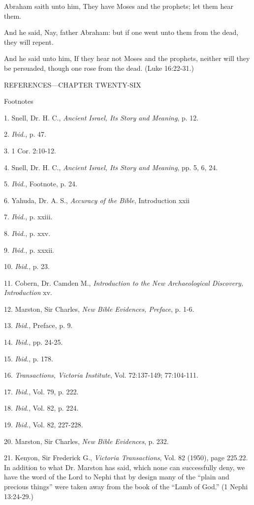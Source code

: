 Abraham saith unto him, They have Moses and the prophets; let them hear them.

And he said, Nay, father Abraham: but if one went unto them from the dead, they will repent.

And he said unto him, If they hear not Moses and the prophets, neither will they be
persuaded, though one rose from the dead. (Luke 16:22-31.)

\newpage
REFERENCES—CHAPTER TWENTY-SIX

Footnotes

1. Snell, Dr. H. C., \textit{Ancient Israel, Its Story and Meaning}, p. 12.

2. \textit{Ibid.}, p. 47.

3. 1 Cor. 2:10-12.

4. Snell, Dr. H. C., \textit{Ancient Israel, Its Story and Meaning}, pp. 5, 6, 24.

5. \textit{Ibid.}, Footnote, p. 24.

6. Yahuda, Dr. A. S., \textit{Accuracy of the Bible}, Introduction xxii

7. \textit{Ibid.}, p. xxiii.

8. \textit{Ibid.}, p. xxv.

9. \textit{Ibid.}, p. xxxii.

10. \textit{Ibid.}, p. 23.

11. Cobern, Dr. Camden M., \textit{Introduction to the New Archaeological Discovery, Introduction}
xv.

12. Marston, Sir Charles, \textit{New Bible Evidences, Preface}, p. 1-6.

13. \textit{Ibid.}, Preface, p. 9.

14. \textit{Ibid.}, pp. 24-25.

15. \textit{Ibid.}, p. 178.

16. \textit{Transactions, Victoria Institute}, Vol. 72:137-149; 77:104-111.

17. \textit{Ibid.}, Vol. 79, p. 222.

18. \textit{Ibid.}, Vol. 82, p. 224.

19. \textit{Ibid.}, Vol. 82, 227-228.

20. Marston, Sir Charles, \textit{New Bible Evidences}, p. 232.

21. Kenyon, Sir Frederick G., \textit{Victoria Transactions}, Vol. 82 (1950), page 225.22. In addition to what Dr. Marston has said, which none can successfully deny, we have the
word of the Lord to Nephi that by design many of the ``plain and precious things'' were taken
away from the book of the ``Lamb of God.'' (1 Nephi 13:24-29.)

